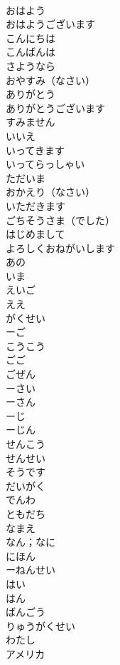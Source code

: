 \documentclass[8pt]{extreport}
\begin{document}
\begin{CJK}{UTF8}{min}
\\	おはよう	
\\	おはようございます	
\\	こんにちは	
\\	こんばんは	
\\	さようなら	
\\	おやすみ（なさい）	
\\	ありがとう	
\\	ありがとうございます	
\\	すみません	
\\	いいえ	
\\	いってきます	
\\	いってらっしゃい	
\\	ただいま	
\\	おかえり（なさい）	
\\	いただきます	
\\	ごちそうさま（でした）	
\\	はじめまして	
\\	よろしくおねがいします	
\\	あの	
\\	いま	
\\	えいご	
\\	ええ	
\\	がくせい	
\\	ーご	
\\	こうこう	
\\	ごご	
\\	ごぜん	
\\	ーさい	
\\	ーさん	
\\	ーじ	
\\	ーじん	
\\	せんこう	
\\	せんせい	
\\	そうです	
\\	だいがく	
\\	でんわ	
\\	ともだち	
\\	なまえ	
\\	なん；なに	
\\	にほん	
\\	ーねんせい	
\\	はい	
\\	はん	
\\	ばんごう	
\\	りゅうがくせい	
\\	わたし	
\\	アメリカ	

\end{CJK}
\end{document}
